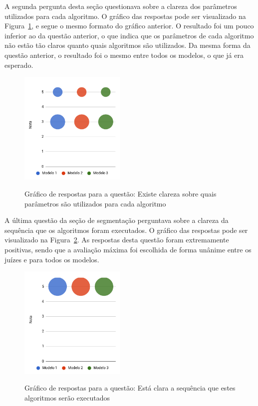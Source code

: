 \documentclass[12pt,oneside,a4paper,english,french,spanish,brazil,]{abntex2}
\begin{document}
A segunda pergunta desta seção questionava sobre a clareza dos parâmetros utilizados para cada algoritmo. O gráfico das respostas pode ser visualizado na Figura~\ref{fig:AJ_Qualidade_9}, e segue o mesmo formato do gráfico anterior. O resultado foi um pouco inferior ao da questão anterior, o que indica que os parâmetros de cada algoritmo não estão tão claros quanto quais algoritmos são utilizados. Da mesma forma da questão anterior, o resultado foi o mesmo entre todos os modelos, o que já era esperado.

\begin{figure}[ht]
\centering
\caption{Gráfico de respostas para a questão: Existe clareza sobre quais parâmetros são utilizados para cada algoritmo}
\includegraphics[width=0.45\textwidth]{imagens/Avaliacao_Juizes/Grafico_9.png}
\sourceAuthor{}
\label{fig:AJ_Qualidade_9}
\end{figure}

A última questão da seção de segmentação perguntava sobre a clareza da sequência que os algoritmos foram executados. O gráfico das respostas pode ser visualizado na Figura~\ref{fig:AJ_Qualidade_10}. As respostas desta questão foram extremamente positivas, sendo que a avaliação máxima foi escolhida de forma unânime entre os juízes e para todos os modelos.

\begin{figure}[ht]
\centering
\caption{Gráfico de respostas para a questão: Está clara a sequência que estes algoritmos serão executados}
\includegraphics[width=0.45\textwidth]{imagens/Avaliacao_Juizes/Grafico_11.png}
\sourceAuthor{}
\label{fig:AJ_Qualidade_10}
\end{figure}
\end{document}

